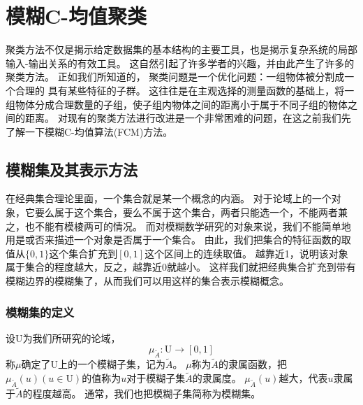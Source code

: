 \chapter[模糊C-均值聚类]{模糊C-均值聚类}
聚类方法不仅是揭示给定数据集的基本结构的主要工具，也是揭示复杂系统的局部输入-输出关系的有效工具。
这自然引起了许多学者的兴趣，并由此产生了许多的聚类方法。
正如我们所知道的， 聚类问题是一个优化问题：一组物体被分割成一个合理的 具有某些特征的子群。
这往往是在主观选择的测量函数的基础上，将一组物体分成合理数量的子组，使子组内物体之间的距离小于属于不同子组的物体之间的距离。
对现有的聚类方法进行改进是一个非常困难的问题，在这之前我们先了解一下模糊C-均值算法(FCM)方法。
\section{模糊集及其表示方法}
\par
在经典集合理论里面，一个集合就是某一个概念的内涵。
对于论域上的一个对象，它要么属于这个集合，要么不属于这个集合，两者只能选一个，不能两者兼之，也不能有模棱两可的情况。
而对模糊数学研究的对象来说，我们不能简单地用是或否来描述一个对象是否属于一个集合。
由此，我们把集合的特征函数的取值从$\{0,1\}$这个集合扩充到$[0,1]$这个区间上的连续取值。
越靠近1，说明该对象属于集合的程度越大，反之，越靠近0就越小。
这样我们就把经典集合扩充到带有模糊边界的模糊集了，从而我们可以用这样的集合表示模糊概念。
\subsection{模糊集的定义}
\begin{definition}
    设$\mathrm{U}$为我们所研究的论域，
    \[
        \mu_{\tilde{A}}: \mathrm{U} \longrightarrow[0,1]
    \]
    称$\mu$确定了$\mathrm{U}$上的一个模糊子集，记为$\tilde{A}$。
    $\mu$称为$\tilde{A}$的隶属函数，把$\mu_{\tilde{A}}(u)(u \in \mathrm{U})$的值称为$u$对于模糊子集$\tilde{A}$的隶属度。
    $\mu_{\tilde{A}}(u)$越大，代表$u$隶属于$\tilde{A}$的程度越高。
    通常，我们也把模糊子集简称为模糊集。
\end{definition}
